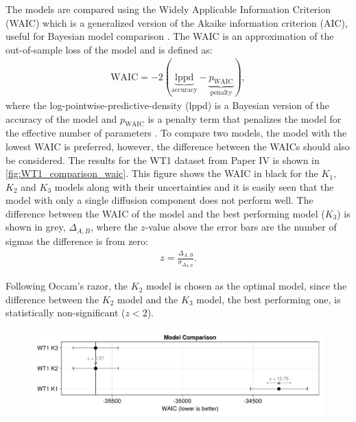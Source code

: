 The models are compared using the Widely Applicable Information Criterion (WAIC) \parencite{watanabeAsymptoticEquivalenceBayes2010a} which is a generalized version of the Akaike information criterion (AIC), useful for Bayesian model comparison \parencite{gelmanUnderstandingPredictiveInformation2014a}. The WAIC is an approximation of the out-of-sample loss of the model and is defined as:
\begin{align}
    \mathrm{WAIC} = -2(\underbrace{\mathrm{lppd}}_\textrm{accuracy} - \underbrace{p_\mathrm{WAIC}}_\textrm{penalty}),
\end{align}
where the log-pointwise-predictive-density ($\mathrm{lppd}$) is a Bayesian version of the accuracy of the model and $p_\mathrm{WAIC}$ is a penalty term that penalizes the model for the effective number of parameters \parencite{mcelreathStatisticalRethinkingBayesian2020}. To compare two models, the model with the lowest WAIC is preferred, however, the difference between the WAICs should also be considered. The results for the WT1 dataset from Paper IV is shown in \autoref{fig:WT1_comparison_waic}. This figure shows the WAIC in black for the $K_1$, $K_2$ and $K_3$ models along with their uncertainties and it is easily seen that the model with only a single diffusion component does not perform well. The difference between the WAIC of the model and the best performing model ($K_3$) is shown in grey, $\Delta_{A,B}$, where the $z$-value above the error bars are the number of sigmas the difference is from zero:
\begin{align}
    z = \frac{\Delta_{A,B}}{\sigma_{\Delta_{A,B}}}.
\end{align}

Following Occam's razor, the $K_2$ model is chosen as the optimal model, since the difference between the $K_2$ model and the $K_3$ model, the best performing one, is statistically non-significant ($z<2$).


\begin{figure}[htbp]
    \centering
    \includegraphics[trim={0mm 0mm 0mm 0mm}, clip, width=\textwidth]{figures/WT1_comparison_waic.pdf}
\end{figure}
